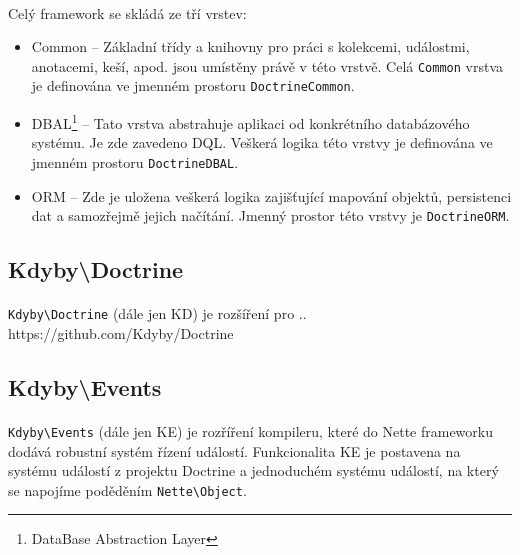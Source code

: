 \documentclass[11pt,oneside]{fithesis}
\begin{document}
        \paragraph*{}
        Celý framework se skládá ze tří vrstev:
        \begin{itemize}
        \item Common -- Základní třídy a knihovny pro práci s kolekcemi, událostmi, anotacemi, keší, apod. jsou umístěny právě v této vrstvě. Celá \verb|Common| vrstva je definována ve jmenném prostoru \verb|DoctrineCommon|.
        \item DBAL\footnote{DataBase Abstraction Layer}
            -- Tato vrstva abstrahuje aplikaci od konkrétního databázového systému. Je zde zavedeno DQL. Veškerá logika této vrstvy je definována ve jmenném prostoru \verb|DoctrineDBAL|.
        \item ORM -- Zde je uložena veškerá logika zajišťující mapování objektů, persistenci dat a samozřejmě jejich načítání. Jmenný prostor této vrstvy je \verb|DoctrineORM|.
        \end{itemize}


        \subsection{Kdyby\textbackslash Doctrine}
        \paragraph*{}
        \verb|Kdyby\Doctrine| (dále jen KD) je rozšíření pro ..
        https://github.com/Kdyby/Doctrine

        \subsection{Kdyby\textbackslash Events}
        \paragraph*{}
        \verb|Kdyby\Events| (dále jen KE) je rozříření kompileru, které do Nette frameworku dodává robustní systém řízení událostí. Funkcionalita KE je postavena na systému událostí z projektu Doctrine a jednoduchém systému událostí, na který se napojíme poděděním \verb|Nette\Object|.
\end{document}
